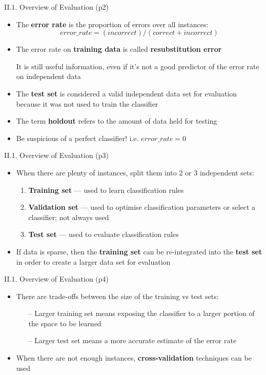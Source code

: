 \documentclass[handout]{beamer}
\newcommand{\strong}[1]{\textbf{\color{teal} #1}}
\newcommand{\stronger}[1]{\textbf{\color{purple} #1}}
\begin{document}
\begin{frame}{II.1. Overview of Evaluation (p2)}
\begin{itemize}
\item The \strong{error rate} is the proportion of errors over all instances:
\[
error\_rate = ( incorrect ) / ( correct + incorrect )
\]
\item The error rate on \stronger{training data} is called \strong{resubstitution error}
\item[] It is still useful information, even if it's not a good predictor of the error rate on independent data
\item The \stronger{test set} is considered a valid independent data set for evaluation because it was not used to train the classifier
\item The term \strong{holdout} refers to the amount of data held for testing
\item Be suspicious of a perfect classifier! i.e. $error\_rate = 0$
\end{itemize}
\end{frame}
\begin{frame}{II.1. Overview of Evaluation (p3)}
\begin{itemize}
\item When there are plenty of instances, split them into 2 or 3 independent sets:
	\begin{enumerate}
	\item \stronger{Training set} --- used to learn classification rules
	\item \stronger{Validation set} --- used to optimise classification parameters or select a classifier; not always used
	\item \stronger{Test set} --- used to evaluate classification rules
	\end{enumerate}
\item If data is sparse, then the \strong{training set} can be re-integrated into the \strong{test set} in order to create a larger data set for evaluation
\end{itemize}
\end{frame}
\begin{frame}{II.1. Overview of Evaluation (p4)}
\begin{itemize}
\item There are trade-offs between the size of the training vs test sets:
	\begin{itemize}
	\item[--] Larger training set means exposing the classifier to a larger portion of the space to be learned
	\item[--] Larger test set means a more accurate estimate of the error rate
	\end{itemize}
\item When there are not enough instances, \stronger{cross-validation} techniques can be used
\end{itemize}
\end{frame}
\end{document}
